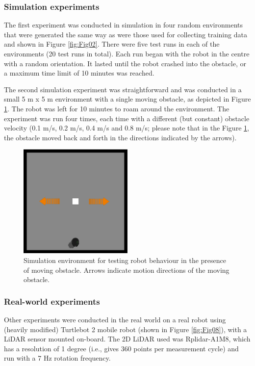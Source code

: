 \subsubsection{Simulation experiments}

The first experiment was conducted in simulation in four random environments that were generated the same way as were those used for collecting training data and shown in Figure \ref{fig:Fig02}. There were five test runs in each of the environments (20 test runs in total). Each run began with the robot in the centre with a random orientation. It lasted until the robot crashed into the obstacle, or a maximum time limit of 10 minutes was reached.

The second simulation experiment was straightforward and was conducted in a small 5 m x 5 m environment with a single moving obstacle, as depicted in Figure \ref{fig:Fig07}. The robot was left for 10 minutes to roam around the environment. The experiment was run four times, each time with a different (but constant) obstacle velocity (0.1 m/s, 0.2 m/s, 0.4 m/s and 0.8 m/s; please note that in the Figure \ref{fig:Fig07}, the obstacle moved back and forth in the directions indicated by the arrows). 

\begin{figure}
    \centering
    \includegraphics[width=0.5\textwidth]{slike/turkish/Fig07.pdf}
    \caption{Simulation environment for testing robot behaviour in the presence of moving obstacle. Arrows indicate motion directions of the moving obstacle.}
    \label{fig:Fig07}
\end{figure}

\subsubsection{Real-world experiments}

Other experiments were conducted in the real world on a real robot using (heavily modified) Turtlebot 2 mobile robot (shown in Figure \ref{fig:Fig08}), with a LiDAR sensor mounted on-board. The 2D LiDAR used was Rplidar-A1M8, which has a resolution of 1 degree (i.e., gives 360 points per measurement cycle) and run with a 7 Hz rotation frequency. 

